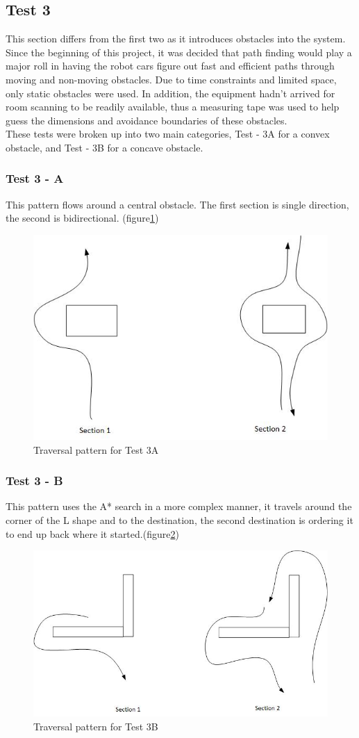 \documentclass[10pt,a4paper]{article}
\begin{document}
	\subsection{Test 3}
	This section differs from the first two as it introduces obstacles into the system. Since the beginning of this project, it was decided that path finding would play a major roll in having the robot cars figure out fast and efficient paths through moving and non-moving obstacles. Due to time constraints and limited space, only static obstacles were used. In addition, the equipment hadn't arrived for room scanning to be readily available, thus a measuring tape was used to help guess the dimensions and avoidance boundaries of these obstacles.
	\\
	These tests were broken up into two main categories, Test - 3A for a convex obstacle, and Test - 3B for a concave obstacle.
	
	\subsubsection{Test 3 - A}
	This pattern flows around a central obstacle. The first section is single direction, the second is bidirectional. (figure\ref{fig:convex_travesal})
		\begin{figure}
			\centering
			\includegraphics[width=.6\textwidth]{convex_traversals.jpg}
			\caption{Traversal pattern for Test 3A}
			\label{fig:convex_travesal}
		\end{figure}
	\subsubsection{Test 3 - B}
	This pattern uses the A* search in a more complex manner, it travels around the corner of the L shape and to the destination, the second destination is ordering it to end up back where it started.(figure\ref{fig:concave_travesal})
		\begin{figure}
			\centering
			\includegraphics[width=.6\textwidth]{concave_traversals.jpg}
			\caption{Traversal pattern for Test 3B}
			\label{fig:concave_travesal}
		\end{figure}
	
\end{document}
